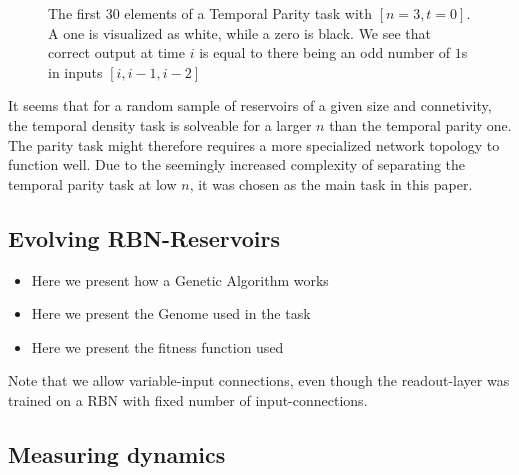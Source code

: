 \begin{figure}


  \caption{
    The first 30 elements of a Temporal Parity task with $[n=3, t=0]$.
    A one is visualized as white, while a zero is black.
    We see that correct output at time $i$ is equal to there being an odd number of $1$s in inputs $[i, i-1, i-2]$
  }
  \label{figure:temporal-parity}
\end{figure}

It seems that for a random sample of reservoirs of a given size and connetivity,
the temporal density task is solveable for a larger $ n $ than the temporal parity one.
The parity task might therefore requires a more specialized network topology to function well.
Due to the seemingly increased complexity of separating the temporal parity task at low $ n $,
it was chosen as the main task in this paper.


\subsection{Evolving RBN-Reservoirs}

\begin{itemize}
  \item Here we present how a Genetic Algorithm works
  \item Here we present the Genome used in the task
  \item Here we present the fitness function used
\end{itemize}

Note that we allow variable-input connections, even though the readout-layer was trained on a RBN with fixed number of input-connections.

\subsection{Measuring dynamics}

